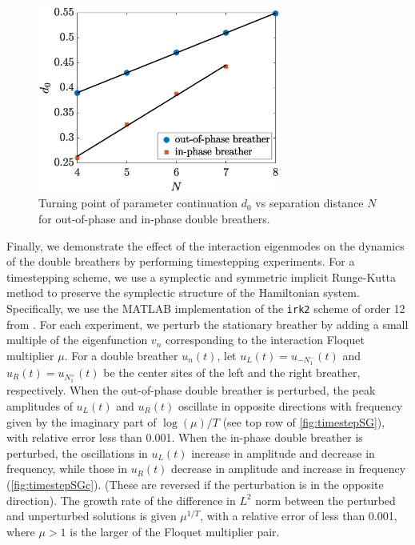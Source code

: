 \documentclass[12pt,reqno]{amsart}
\theoremstyle{definition}
\begin{document}
\begin{figure}
	\begin{center}
	\includegraphics[width=8cm]{doubled0vsN.eps} 
	\end{center}
	\caption{Turning point of parameter continuation $d_0$ vs separation distance $N$ for out-of-phase and in-phase double breathers.}
	\label{fig:SGd0}
\end{figure}

Finally, we demonstrate the effect of the interaction eigenmodes on the dynamics of the double breathers by performing timestepping experiments. For a timestepping scheme, we use a symplectic and symmetric implicit Runge-Kutta method \cite{HairerBook} to preserve the symplectic structure of the Hamiltonian system. Specifically, we use the MATLAB implementation of the \texttt{irk2} scheme of order 12 from \cite{Hairer2003}.
For each experiment, we perturb the stationary breather by adding a small multiple of the eigenfunction $v_n$ corresponding to the interaction Floquet multiplier $\mu$. For a double breather $u_n(t)$, let $u_L(t) = u_{-N_1^-}(t)$ and $u_R(t) = u_{N_1^+}(t)$ be the center sites of the left and the right breather, respectively. When the out-of-phase double breather is perturbed, the peak amplitudes of $u_L(t)$ and $u_R(t)$ oscillate in opposite directions with frequency given by the imaginary part of $\log(\mu)/T$ (see top row of \cref{fig:timestepSG}), with relative error less than 0.001. When the in-phase double breather is perturbed, the oscillations in $u_L(t)$ increase in amplitude and decrease in frequency, while those in $u_R(t)$ decrease in amplitude and increase in frequency (\cref{fig:timestepSGc}). (These are reversed if the perturbation is in the opposite direction). The growth rate of the difference in $L^2$ norm between the perturbed and unperturbed solutions is given $\mu^{1/T}$, with a relative error of less than 0.001, where $\mu > 1$ is the larger of the Floquet multiplier pair.
\end{document}
